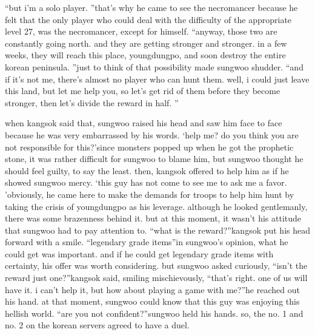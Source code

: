 “but i’m a solo player.
”that’s why he came to see the necromancer because he felt that the only player who could deal with the difficulty of the appropriate level 27, was the necromancer, except for himself.
 “anyway, those two are constantly going north.
 and they are getting stronger and stronger.
 in a few weeks, they will reach this place, youngdungpo, and soon destroy the entire korean peninsula.
”just to think of that possibility made sungwoo shudder.
“and if it’s not me, there’s almost no player who can hunt them.
 well, i could just leave this land, but let me help you, so let’s get rid of them before they become stronger, then let’s divide the reward in half.
”

when kangsok said that, sungwoo raised his head and saw him face to face because he was very embarrassed by his words.
‘help me? do you think you are not responsible for this?’since monsters popped up when he got the prophetic stone, it was rather difficult for sungwoo to blame him, but sungwoo thought he should feel guilty, to say the least.
then, kangsok offered to help him as if he showed sungwoo mercy.
‘this guy has not come to see me to ask me a favor.
’obviously, he came here to make the demands for troops to help him hunt by taking the crisis of youngdungpo as his leverage.
 although he looked gentlemanly, there was some brazenness behind it.
but at this moment, it wasn’t his attitude that sungwoo had to pay attention to.
“what is the reward?”kangsok put his head forward with a smile.
“legendary grade items”in sungwoo’s opinion, what he could get was important.
 and if he could get legendary grade items with certainty, his offer was worth considering.
but sungwoo asked curiously, “isn’t the reward just one?”kangsok said, smiling mischievously, “that’s right.
 one of us will have it.
 i can’t help it, but how about playing a game with me?”he reached out his hand.
at that moment, sungwoo could know that this guy was enjoying this hellish world.
“are you not confident?”sungwoo held his hands.
so, the no.
1 and no.
 2 on the korean servers agreed to have a duel.


 